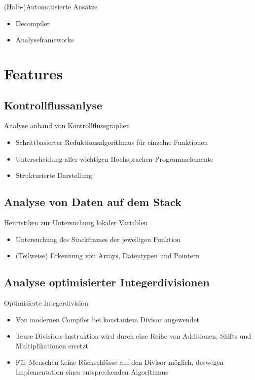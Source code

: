 \documentclass{beamer}
\begin{document}
\begin{frame}{(Halb-)Automatisierte Ansätze}
  \begin{itemize}
  \item Decompiler
  \item Analyseframeworks
  \end{itemize}
\end{frame}

\section{Features}

\subsection{Kontrollflussanlyse}

\begin{frame}{Analyse anhand von Kontrollflussgraphen}
  \begin{itemize}
  \item Schrittbasierter Reduktionsalgorithmus für einzelne Funktionen
  \item Unterscheidung aller wichtigen Hochsprachen-Programmelemente
  \item Strukturierte Darstellung
  \end{itemize}
\end{frame}

\subsection{Analyse von Daten auf dem Stack}

\begin{frame}{Heuristiken zur Untersuchung lokaler Variablen}
  \begin{itemize}
  \item Untersuchung des Stackframes der jeweiligen Funktion
  \item (Teilweise) Erkennung von Arrays, Datentypen und Pointern
  \end{itemize}
\end{frame}

\subsection{Analyse optimisierter Integerdivisionen}

\begin{frame}{Optimisierte Integerdivision}
  \begin{itemize}
  \item Von modernen Compiler bei konstantem Divisor angewendet
  \item Teure Divisions-Instruktion wird durch eine Reihe von Additionen, Shifts und Multiplikationen ersetzt
  \item Für Menschen keine Rückschlüsse auf den Divisor möglich, deswegen Implementation eines entsprechenden Algorithmus
  \end{itemize}
\end{frame}
\end{document}
